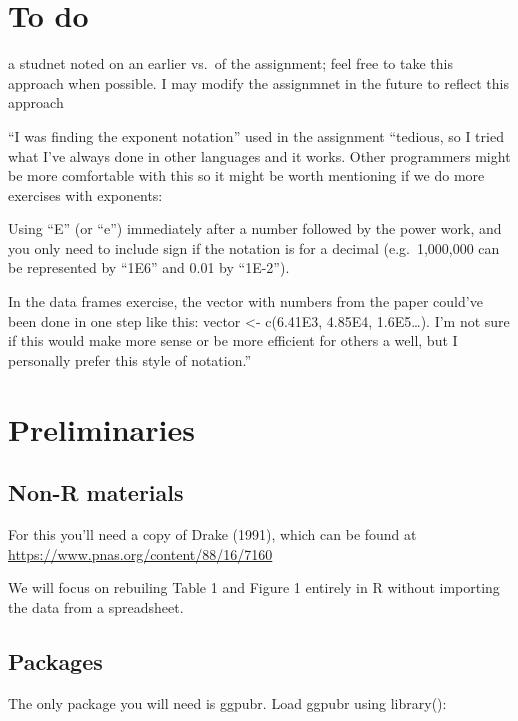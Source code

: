 \documentclass[
]{book}
\begin{document}
\hypertarget{to-do}{%
\section{To do}\label{to-do}}

a studnet noted on an earlier vs.~of the assignment; feel free to take this approach when possible. I may modify the assignmnet in the future to reflect this approach

``I was finding the exponent notation'' used in the assignment ``tedious, so I tried what I've always done in other languages and it works. Other programmers might be more comfortable with this so it might be worth mentioning if we do more exercises with exponents:

Using ``E'' (or ``e'') immediately after a number followed by the power work, and you only need to include sign if the notation is for a decimal (e.g.~1,000,000 can be represented by ``1E6'' and 0.01 by ``1E-2'').

In the data frames exercise, the vector with numbers from the paper could've been done in one step like this: vector \textless- c(6.41E3, 4.85E4, 1.6E5\ldots). I'm not sure if this would make more sense or be more efficient for others a well, but I personally prefer this style of notation.''

\hypertarget{preliminaries}{%
\section{Preliminaries}\label{preliminaries}}

\hypertarget{non-r-materials}{%
\subsection{Non-R materials}\label{non-r-materials}}

For this you'll need a copy of Drake (1991), which can be found at \url{https://www.pnas.org/content/88/16/7160}

We will focus on rebuiling Table 1 and Figure 1 entirely in R without importing the data from a spreadsheet.

\hypertarget{packages-1}{%
\subsection{Packages}\label{packages-1}}

The only package you will need is ggpubr. Load ggpubr using library():
\end{document}

